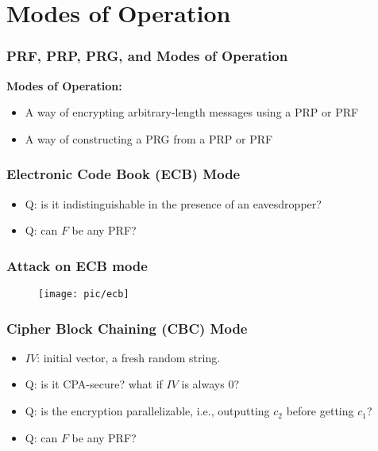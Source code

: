 \section{Modes of Operation}
\begin{frame}\frametitle{PRF, PRP, PRG, and Modes of Operation}
\textbf{Modes of Operation:}
\begin{itemize} 
\item A way of encrypting arbitrary-length messages using a PRP or PRF
\item A way of constructing a PRG from a PRP or PRF
\end{itemize}
\end{frame}
\begin{frame}\frametitle{Electronic Code Book (ECB) Mode}
\begin{figure}
\begin{center}

\end{center}
\end{figure}
\begin{itemize}
\item \alert{Q: is it indistinguishable in the presence of an eavesdropper?}
\item \alert{Q: can $F$ be any PRF?}
\end{itemize}
\end{frame}
\begin{frame}\frametitle{Attack on ECB mode}
\begin{figure}
\begin{center}
\texttt{[image: pic/ecb]} 
\end{center}
\end{figure}
\end{frame}
\begin{frame}\frametitle{Cipher Block Chaining (CBC) Mode}
\begin{figure}
\begin{center}

\end{center}
\end{figure}
\begin{itemize}
\item $IV$: initial vector, a fresh random string.
\item \alert{Q: is it CPA-secure? what if $IV$ is always $0$?}
\item \alert{Q: is the encryption parallelizable, i.e., outputting $c_{2}$ before getting $c_{1}$?}
\item \alert{Q: can $F$ be any PRF?}
\end{itemize}
\end{frame}
